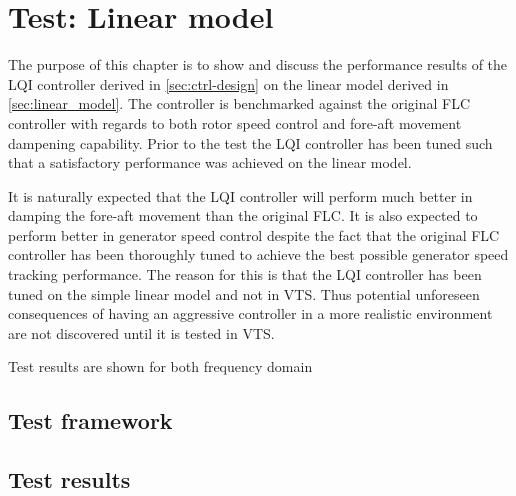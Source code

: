 \section{Test: Linear model}
The purpose of this chapter is to show and discuss the performance results of the LQI controller derived in \cref{sec:ctrl-design} on the linear model derived in \cref{sec:linear_model}. The controller is benchmarked against the original FLC controller with regards to both rotor speed control and fore-aft movement dampening capability. Prior to the test the LQI controller has been tuned such that a satisfactory performance was achieved on the linear model. 

It is naturally expected that the LQI controller will perform much better in damping the fore-aft movement than the original FLC. It is also expected to perform better in generator speed control despite the fact that the original FLC controller has been thoroughly tuned to achieve the best possible generator speed tracking performance. The reason for this is that the LQI controller has been tuned on the simple linear model and not in VTS. Thus potential unforeseen consequences of having an aggressive controller in a more realistic environment are not discovered until it is tested in VTS.

Test results are shown for both frequency domain 

\subsection{Test framework}



\subsection{Test results}